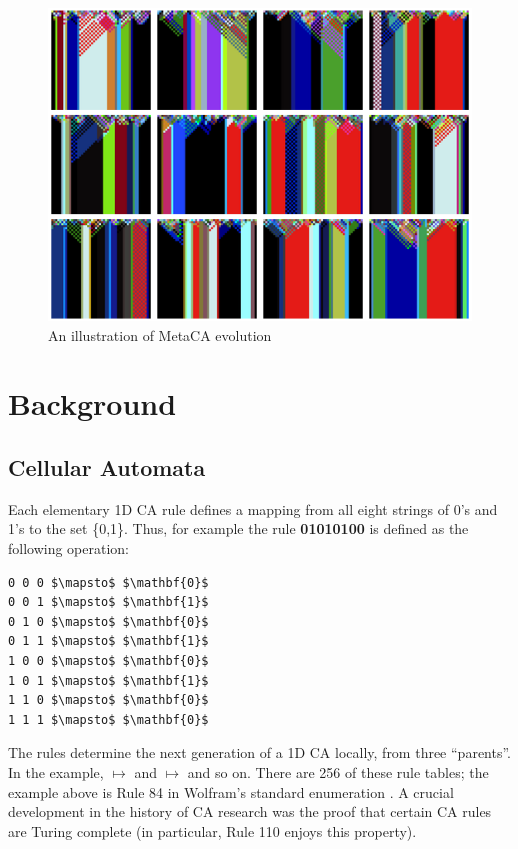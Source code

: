 \documentclass{AISB2008}
\makeatletter
\renewcommand{\boxed}[1]{\text{\fboxsep=.2em\fbox{\m@th$\displaystyle#1$}}}
\newcommand{\mystrut}{\vphantom{b\gamma}}
\makeatother
\begin{document}
\begin{figure}
\includegraphics[width=\columnwidth]{metaca2.png}
\caption{An illustration of MetaCA evolution\label{metaca-taster}}
\end{figure}

\newpage

\section{Background}

\subsection{Cellular Automata}

Each elementary 1D CA rule defines a mapping from all eight strings of
0's and 1's to the set \{0,1\}.  Thus, for example the rule \textbf{01010100}
is defined as the following operation:
\begin{lstlisting}[mathescape]
0 0 0 $\mapsto$ $\mathbf{0}$
0 0 1 $\mapsto$ $\mathbf{1}$
0 1 0 $\mapsto$ $\mathbf{0}$
0 1 1 $\mapsto$ $\mathbf{1}$
1 0 0 $\mapsto$ $\mathbf{0}$
1 0 1 $\mapsto$ $\mathbf{1}$
1 1 0 $\mapsto$ $\mathbf{0}$
1 1 1 $\mapsto$ $\mathbf{0}$
\end{lstlisting}

The rules determine the next generation of a 1D CA locally, from three ``parents''.  In the example,
\boxed{0\mystrut}\boxed{0\mystrut}\boxed{0\mystrut} $\mapsto$
\boxed{0\mystrut} and
\boxed{0\mystrut}\boxed{0\mystrut}\boxed{1\mystrut} $\mapsto$
\boxed{1\mystrut} and so on.
There are 256 of these rule tables; the example above is Rule 84 in
Wolfram's standard enumeration \cite{wolfram1994cellular}.
A crucial development in the history of CA research was the proof
\cite{cook2004universality} that certain CA rules are Turing complete
(in particular, Rule 110 enjoys this
property).
\end{document}
